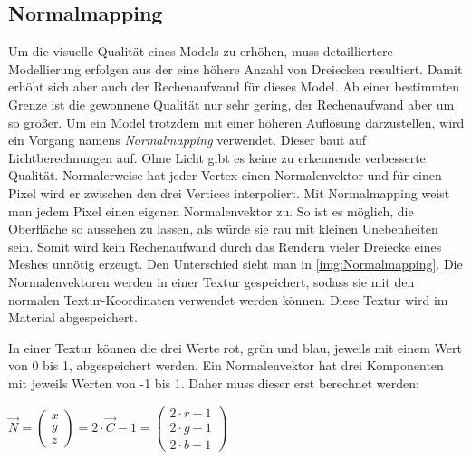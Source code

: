 \subsection{Normalmapping}
\label{section:Normalmapping}

Um die visuelle Qualität eines Models zu erhöhen, muss detailliertere Modellierung erfolgen aus der eine höhere Anzahl von Dreiecken resultiert. 
Damit erhöht sich aber auch der Rechenaufwand für dieses Model. Ab einer bestimmten Grenze ist die gewonnene Qualität nur sehr gering, der Rechenaufwand aber um so größer. 
Um ein Model trotzdem mit einer höheren Auflösung darzustellen, wird ein Vorgang namens \textit{Normalmapping} verwendet. 
Dieser baut auf Lichtberechnungen auf. Ohne Licht gibt es keine zu erkennende verbesserte Qualität. Normalerweise hat jeder Vertex einen Normalenvektor und für einen Pixel wird er zwischen den drei Vertices interpoliert. 
Mit Normalmapping weist man jedem Pixel einen eigenen Normalenvektor zu. So ist es möglich, die Oberfläche so aussehen zu lassen, als würde sie rau mit kleinen Unebenheiten sein. Somit wird kein Rechenaufwand durch das Rendern vieler Dreiecke eines Meshes unnötig erzeugt.
Den Unterschied sieht man in \cref{img:Normalmapping}. Die Normalenvektoren werden in einer Textur gespeichert, sodass sie mit den normalen Textur-Koordinaten verwendet werden können. Diese Textur wird im Material abgespeichert.

In einer Textur können die drei Werte rot, grün und blau, jeweils mit einem Wert von 0 bis 1, abgespeichert werden. Ein Normalenvektor hat drei Komponenten mit jeweils Werten von -1 bis 1. Daher muss dieser erst berechnet werden:

$ \overrightarrow{N} = 
\begin{pmatrix}
x \\ y \\ z
\end{pmatrix}
 = 2 \cdot \overrightarrow{C} - 1 = 
 \begin{pmatrix}
 2 \cdot r - 1 \\ 2 \cdot g - 1 \\ 2 \cdot b - 1
 \end{pmatrix}$
 
